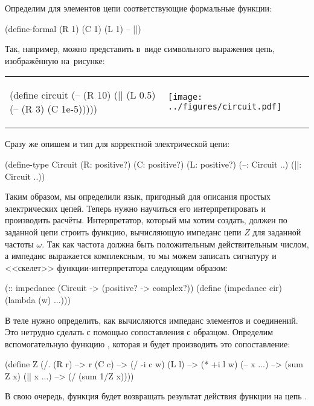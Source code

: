 Определим для элементов цепи соответствующие формальные функции:
\begin{Definition}
(define-formal 
  (R 1) (C 1) (L 1) -- ||)
\end{Definition}
Так, например, можно представить в~виде символьного выражения цепь, изображённую на~рисунке:

\medskip
\begin{tabular}{ll}%
\label{circuit}
\begin{SchemeCode}
(define circuit
  (-- (R 10)
      (|| (L 0.5)
          (-- (R 3)
              (C 1e-5)))))
\end{SchemeCode}
&
\texttt{[image: ../figures/circuit.pdf]}
\end{tabular}
\newpage

\noindent Сразу же опишем и тип для корректной электрической цепи:
\begin{Definition}
(define-type Circuit
  (R: positive?)
  (C: positive?)
  (L: positive?)
  (--: Circuit ..)
  (||: Circuit ..))
\end{Definition}

Таким образом, мы определили язык, пригодный для описания простых электрических цепей. Теперь нужно научиться его интерпретировать и производить расчёты. Интерпретатор, который мы хотим создать, должен по заданной цепи строить функцию, вычисляющую импеданс цепи $Z$ для заданной частоты $\omega$. Так как частота должна быть положительным действительным числом, а импеданс выражается комплексным, то мы можем записать сигнатуру и <<скелет>> функции-интерпретатора  следующим образом:

\begin{SchemeCode}[emph={cir,w}]
(:: impedance (Circuit -> (positive? -> complex?))
 (define (impedance cir)
   (lambda (w) ...)))
\end{SchemeCode}

В теле  нужно определить, как вычисляются импеданс элементов и соединений. Это нетрудно сделать с помощью сопоставления с образцом. Определим вспомогательную функцию , которая и будет производить это сопоставление:
\begin{SchemeCode}[emph={cir,w,r,c,l}]
(define Z 
  (/. (R r) --> r
      (C c) --> (/ -i c w)
      (L l) --> (* +i l w)
      (-- x ...) --> (sum Z x)
      (|| x ...) --> (/ (sum 1/Z x))))
\end{SchemeCode}
В свою очередь, функция  будет возвращать результат действия функции  на цепь .


